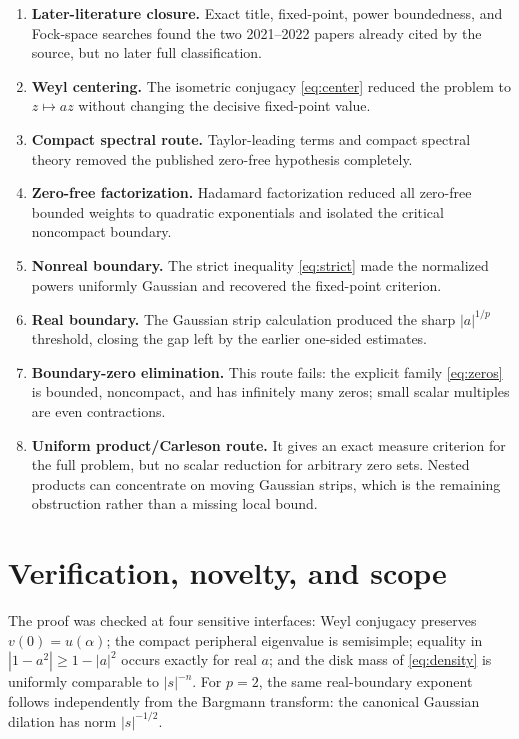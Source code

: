 \documentclass[11pt]{article}
\newcommand{\alphaDW}{\alpha}
\begin{document}
\begin{enumerate}
\item \textbf{Later-literature closure.}  Exact title, fixed-point, power
      boundedness, and Fock-space searches found the two 2021--2022 papers
      already cited by the source, but no later full classification.
\item \textbf{Weyl centering.}  The isometric conjugacy \eqref{eq:center}
      reduced the problem to $z\mapsto az$ without changing the decisive
      fixed-point value.
\item \textbf{Compact spectral route.}  Taylor-leading terms and compact
      spectral theory removed the published zero-free hypothesis completely.
\item \textbf{Zero-free factorization.}  Hadamard factorization reduced all
      zero-free bounded weights to quadratic exponentials and isolated the
      critical noncompact boundary.
\item \textbf{Nonreal boundary.}  The strict inequality
      \eqref{eq:strict} made the normalized powers uniformly Gaussian and
      recovered the fixed-point criterion.
\item \textbf{Real boundary.}  The Gaussian strip calculation produced the
      sharp $|a|^{1/p}$ threshold, closing the gap left by the earlier
      one-sided estimates.
\item \textbf{Boundary-zero elimination.}  This route fails: the explicit
      family \eqref{eq:zeros} is bounded, noncompact, and has infinitely many
      zeros; small scalar multiples are even contractions.
\item \textbf{Uniform product/Carleson route.}  It gives an exact measure
      criterion for the full problem, but no scalar reduction for arbitrary
      zero sets.  Nested products can concentrate on moving Gaussian strips,
      which is the remaining obstruction rather than a missing local bound.
\end{enumerate}

\section{Verification, novelty, and scope}

The proof was checked at four sensitive interfaces: Weyl conjugacy preserves
$v(0)=u(\alphaDW)$; the compact peripheral eigenvalue is semisimple; equality
in $|1-a^2|\ge1-|a|^2$ occurs exactly for real $a$; and the disk mass of
\eqref{eq:density} is uniformly comparable to $|s|^{-n}$.  For $p=2$, the
same real-boundary exponent follows independently from the Bargmann transform:
the canonical Gaussian dilation has norm $|s|^{-1/2}$.
\end{document}
